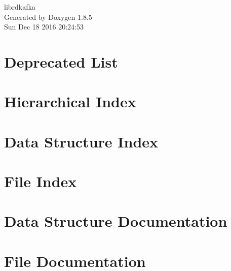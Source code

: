 \documentclass[twoside]{book}
\newcommand{\clearemptydoublepage}{%
  \newpage{\pagestyle{empty}\cleardoublepage}%
}
\begin{document}
\hypersetup{pageanchor=false}
\begin{titlepage}
\vspace*{7cm}
\begin{center}%
{\Large librdkafka }\\
\vspace*{1cm}
{\large Generated by Doxygen 1.8.5}\\
\vspace*{0.5cm}
{\small Sun Dec 18 2016 20:24:53}\\
\end{center}
\end{titlepage}
\clearemptydoublepage
\tableofcontents
\clearemptydoublepage
{}
\hypersetup{pageanchor=true}

\chapter{Deprecated List}
\label{deprecated}
\hypertarget{deprecated}{}

\chapter{Hierarchical Index}

\chapter{Data Structure Index}

\chapter{File Index}

\chapter{Data Structure Documentation}






























\chapter{File Documentation}


\newpage
{}
{}
\printindex
\end{document}
